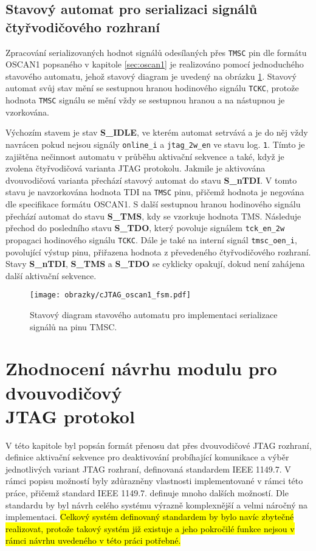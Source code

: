 \subsection{Stavový automat pro serializaci signálů čtyřvodičového rozhraní}	\label{subsec:oscan1_fsm}
Zpracování serializovaných hodnot signálů odesílaných přes \texttt{\acs{TMSC}} pin dle formátu OSCAN1 popsaného v kapitole \ref{sec:oscan1} je realizováno pomocí jednoduchého stavového automatu, jehož stavový diagram je uvedený na obrázku \ref{fig:cJTAG_oscan1_fsm}. Stavový automat svůj stav mění se sestupnou hranou hodinového signálu \texttt{\acs{TCKC}}, protože hodnota \texttt{\acs{TMSC}} signálu se mění vždy se sestupnou hranou a na nástupnou je vzorkována.

Výchozím stavem je stav \textbf{S\_IDLE}, ve kterém automat setrvává a je do něj vždy navrácen pokud nejsou signály \texttt{online\_i} a \texttt{jtag\_2w\_en} ve stavu log. \texttt{1}. Tímto je zajištěna nečinnost automatu v průběhu aktivační sekvence a také, když je zvolena čtyřvodičová varianta \acs{JTAG} protokolu. Jakmile je aktivována dvouvodičová varianta přechází stavový automat do stavu \textbf{S\_nTDI}. V tomto stavu je navzorkována hodnota TDI na \texttt{\acs{TMSC}} pinu, přičemž hodnota je negována dle specifikace formátu OSCAN1. S další sestupnou hranou hodinového signálu přechází automat do stavu \textbf{S\_TMS}, kdy se vzorkuje hodnota TMS. Následuje přechod do posledního stavu \textbf{S\_TDO}, který povoluje signálem \texttt{tck\_en\_2w} propagaci hodinového signálu \texttt{\acs{TCKC}}. Dále je také na interní signál \texttt{tmsc\_oen\_i}, povolující výstup pinu, přiřazena hodnota z převedeného čtyřvodičového rozhraní. Stavy \textbf{S\_nTDI}, \textbf{S\_TMS} a \textbf{S\_TDO} se cyklicky opakují, dokud není zahájena další aktivační sekvence.

\begin{figure}[!h]
  \begin{center}
    \texttt{[image: obrazky/cJTAG\_oscan1\_fsm.pdf]}
  \end{center}
  \caption{Stavový diagram stavového automatu pro implementaci serializace signálů na pinu \acs{TMSC}.}
	\label{fig:cJTAG_oscan1_fsm}
\end{figure}

\section{Zhodnocení návrhu modulu pro dvouvodičový\\ \acs{JTAG} protokol}
V této kapitole byl popsán formát přenosu dat přes dvouvodičové \acs{JTAG} rozhraní, definice aktivační sekvence pro deaktivování probíhající komunikace a výběr jednotlivých variant \acs{JTAG} rozhraní, definovaná standardem IEEE 1149.7. V rámci popisu možností byly zdůrazněny vlastnosti implementované v rámci této práce, přičemž standard IEEE 1149.7. definuje mnoho dalších možností. Dle standardu by byl návrh celého systému výrazně komplexnější a velmi náročný na implementaci. \hl{Celkový systém definovaný standardem by bylo navíc zbytečné realizovat, protože takový systém již existuje a jeho pokročilé funkce nejsou v rámci návrhu uvedeného v této práci potřebné.}

